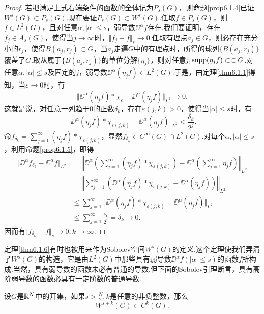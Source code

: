 \begin{proof}
	若把满足上式右端条件的函数的全体记为$P_s(G)$，则命题\ref{prop6.1.4}已证$W^s(G)\subset P_s(G)$.现在要证$P_s(G)\subset W^s(G)$.任取$f\in P_s(G)$，则$f\in L^2(G)$，且对任意$\alpha,|\alpha|\le s$，弱导数$\DD^\alpha f$存在.我们要证明，存在$f_j\in A_s(G)$，使得当$j\to\infty$时，$\Vert f_j-f\Vert_s\to0$.任取有理点$a_j\in G$，则必存在充分小的$r_j$，使得$\bar{B}(a_j,r_j)\subset G$，当$a_j$走遍$G$中的有理点时，所得的球列$\{B(a_j,r_j)\}$覆盖了$G$.取从属于$\{B(a_j,r_j)\}$的单位分解$\{\eta_j\}$，则对任意$j,\operatorname{supp}(\eta_j f)\subset\subset G$.对任意$\alpha,|\alpha|\le s$及固定的$j$，弱导数$\DD^\alpha(\eta_j f)\in L^2(G)$.于是，由定理\ref{thm6.1.1}得知，当$\varepsilon\to0$时，有
	\[\Vert \DD^\alpha(\eta_j f)\ast\chi_\varepsilon-\DD^\alpha (\eta_j f)\Vert_{L^2}\to0.\]
	这就是说，对任意一列趋于$0$的正数$\delta_k$，存在$\varepsilon(j,k)>0$，使得当$|\alpha|\le s$时，有
	\[\Vert\DD^\alpha(\eta_j f)\ast\chi_{\varepsilon(j,k)}-\DD^\alpha(\eta_j f)\Vert_{L^2}<\frac{\delta_k}{2^j}.\]
	命$f_{\delta_k}=\sum_{j=1}^{\infty}(\eta_j f)\ast\chi_{\varepsilon(j,k)}$，显然$f_{\delta_k}\in C^\infty(G)\cap L^2(G)$.对每个$\alpha,|\alpha|\le s$，利用命题\ref{prop6.1.5}，即得
	\begin{align*}
		\Vert\DD^\alpha f_{\delta_k}-\DD^\alpha f\Vert_{L^2}
		&=\left\Vert\DD^\alpha\left(\sum_{j=1}^{\infty}(\eta_j f)\ast\chi_{\varepsilon(j,k)}\right)-\DD^\alpha\left(\sum_{j=1}^{\infty}\eta_j f\right)\right\Vert_{L^2}\\
		&=\left\Vert\sum_{j=1}^{\infty}(\DD^\alpha(\eta_j f)\ast\chi_{\varepsilon(j,k)}-\DD^\alpha(\eta_j f))\right\Vert_{L^2}\\
		&\le\sum_{j=1}^{\infty}\Vert\DD^\alpha(\eta_j f)\ast\chi_{\varepsilon(j,k)}-\DD^\alpha(\eta_j f)\Vert_{L^2}\\
		&\le\sum_{j=1}^{\infty}\frac{\delta_k}{2^j}=\delta_k\to0.
	\end{align*}
因而有$\Vert f_{\delta_k}-f\Vert_s\to0,k\to\infty$.
\end{proof}
定理\ref{thm6.1.6}有时也被用来作为Sobolev空间$W^s(G)$的定义.这个定理使我们弄清了$W^s(G)$的构造，它是由$L^2(G)$中那些具有弱导数$\DD^\alpha f(|\alpha|\le s)$的函数$f$所构成.当然，具有弱导数的函数未必有普通的导数.但下面的Sobolev引理断言，具有高阶弱导数的函数必具有一定阶数的普通导数.
\begin{theorem}\label{thm6.1.7}
	设$G$是$\mathbb R^N$中的开集，如果$s>\frac N2,k$是任意的非负整数，那么
	\[W^{s+k}(G)\subset C^k(G).\]
\end{theorem}
